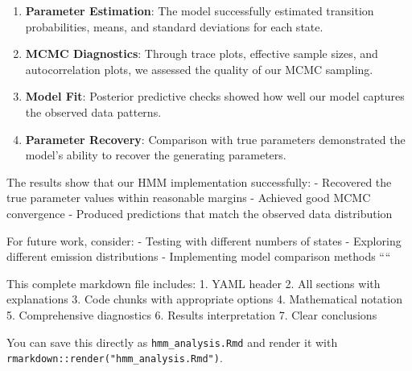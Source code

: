 \documentclass[
]{article}
\providecommand{\tightlist}{%
  \setlength{\itemsep}{0pt}\setlength{\parskip}{0pt}}
\begin{document}
\begin{enumerate}
\def\labelenumi{\arabic{enumi}.}
\tightlist
\item
  \textbf{Parameter Estimation}: The model successfully estimated
  transition probabilities, means, and standard deviations for each
  state.
\item
  \textbf{MCMC Diagnostics}: Through trace plots, effective sample
  sizes, and autocorrelation plots, we assessed the quality of our MCMC
  sampling.
\item
  \textbf{Model Fit}: Posterior predictive checks showed how well our
  model captures the observed data patterns.
\item
  \textbf{Parameter Recovery}: Comparison with true parameters
  demonstrated the model's ability to recover the generating parameters.
\end{enumerate}

The results show that our HMM implementation successfully: - Recovered
the true parameter values within reasonable margins - Achieved good MCMC
convergence - Produced predictions that match the observed data
distribution

For future work, consider: - Testing with different numbers of states -
Exploring different emission distributions - Implementing model
comparison methods ````

This complete markdown file includes: 1. YAML header 2. All sections
with explanations 3. Code chunks with appropriate options 4.
Mathematical notation 5. Comprehensive diagnostics 6. Results
interpretation 7. Clear conclusions

You can save this directly as \texttt{hmm\_analysis.Rmd} and render it
with \texttt{rmarkdown::render("hmm\_analysis.Rmd")}.

  
\end{document}

